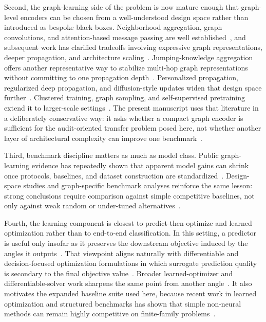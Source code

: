 \documentclass[
  reprint,
  twocolumn,
  aps,
  superscriptaddress,
  longbibliography,
  floatfix
]{revtex4-2}
\begin{document}
Second, the graph-learning side of the problem is now mature enough that graph-level encoders can be chosen from a well-understood design space rather than introduced as bespoke black boxes. Neighborhood aggregation, graph convolutions, and attention-based message passing are well established~\cite{hamilton2017,kipf2017,velickovic2018}, and subsequent work has clarified tradeoffs involving expressive graph representations, deeper propagation, and architecture scaling~\cite{morris2019,maron2019,xu2019}. Jumping-knowledge aggregation offers another representative way to stabilize multi-hop graph representations without committing to one propagation depth~\cite{xu2018jk}. Personalized propagation, regularized deep propagation, and diffusion-style updates widen that design space further~\cite{klicpera2019ppnp,rong2020,klicpera2019diffusion}. Clustered training, graph sampling, and self-supervised pretraining extend it to larger-scale settings~\cite{chiang2019,zeng2020,hu2020pretrain}. The present manuscript uses that literature in a deliberately conservative way: it asks whether a compact graph encoder is sufficient for the audit-oriented transfer problem posed here, not whether another layer of architectural complexity can improve one benchmark~\cite{abuelhaija2019,chen2020sgc}.

Third, benchmark discipline matters as much as model class. Public graph-learning evidence has repeatedly shown that apparent model gains can shrink once protocols, baselines, and dataset construction are standardized~\cite{hu2020ogb,dwivedi2020}. Design-space studies and graph-specific benchmark analyses reinforce the same lesson: strong conclusions require comparison against simple competitive baselines, not only against weak random or under-tuned alternatives~\cite{you2020design,knyazev2019}.

Fourth, the learning component is closest to predict-then-optimize and learned optimization rather than to end-to-end classification. In this setting, a predictor is useful only insofar as it preserves the downstream objective induced by the angles it outputs~\cite{andrychowicz2016,finn2017}. That viewpoint aligns naturally with differentiable and decision-focused optimization formulations in which surrogate prediction quality is secondary to the final objective value~\cite{amos2017,wilder2019}. Broader learned-optimizer and differentiable-solver work sharpens the same point from another angle~\cite{li2017learnopt,vlastelica2020}. It also motivates the expanded baseline suite used here, because recent work in learned optimization and structured benchmarks has shown that simple non-neural methods can remain highly competitive on finite-family problems~\cite{mandi2020,ferber2020}.
\end{document}
